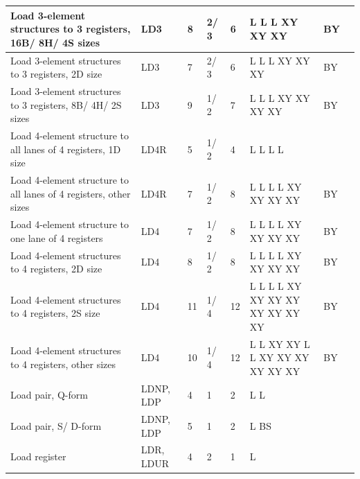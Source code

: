 \begin{longtable}{|p{1in}|p{1in}|l|l|l|p{1in}|l|p{1in}|}
\hline
Load 3-element structures to 3 registers, 16B/ 8H/ 4S sizes & LD3 & 8 & 2/ 3 & 6 & L L L XY XY XY & BY & \\
\hline
Load 3-element structures to 3 registers, 2D size & LD3 & 7 & 2/ 3 & 6 & L L L XY XY XY & BY & \\
\hline
Load 3-element structures to 3 registers, 8B/ 4H/ 2S sizes & LD3 & 9 & 1/ 2 & 7 & L L L XY XY XY XY & BY & \\
\hline
Load 4-element structure to all lanes of 4 registers, 1D size & LD4R & 5 & 1/ 2 & 4 & L L L L &  & \\
\hline
Load 4-element structure to all lanes of 4 registers, other sizes & LD4R & 7 & 1/ 2 & 8 & L L L L XY XY XY XY & BY & \\
\hline
Load 4-element structure to one lane of 4 registers & LD4 & 7 & 1/ 2 & 8 & L L L L XY XY XY XY & BY & \\
\hline
Load 4-element structures to 4 registers, 2D size & LD4 & 8 & 1/ 2 & 8 & L L L L XY XY XY XY & BY & \\
\hline
Load 4-element structures to 4 registers, 2S size & LD4 & 11 & 1/ 4 & 12 & L L L L XY XY XY XY XY XY XY XY & BY & \\
\hline
Load 4-element structures to 4 registers, other sizes & LD4 & 10 & 1/ 4 & 12 & L L XY XY L L XY XY XY XY XY XY & BY & \\
\hline
Load pair, Q-form & LDNP, LDP & 4 & 1 & 2 & L L &  & \\
\hline
Load pair, S/ D-form & LDNP, LDP & 5 & 1 & 2 & L BS &  & \\
\hline
Load register & LDR, LDUR & 4 & 2 & 1 & L &  & \\
\hline
\end{longtable}
